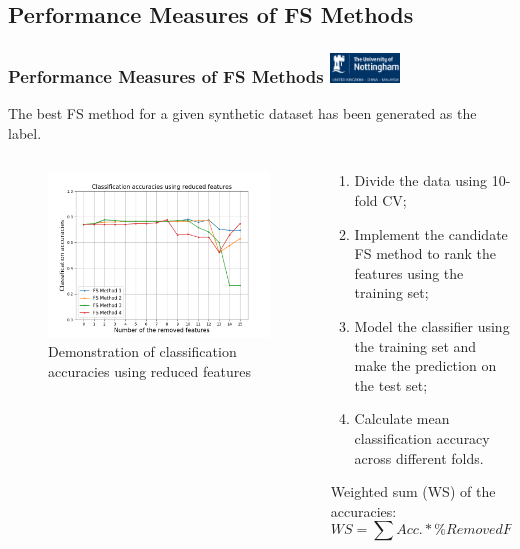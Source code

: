 \documentclass[aspectratio=1610]{beamer}
\newcommand{\UoN}
  {\hfill {\includegraphics[height=0.8cm]{nott_logo/nott_logo_white.png}}}
\begin{document}
\subsection{Performance Measures of FS Methods}
\begin{frame}
\frametitle{Performance Measures of FS Methods \UoN}
The best FS method for a given synthetic dataset has been generated as the label.

	\begin{columns}
		\begin{column}{0.5\textwidth}
			\begin{figure}
				\includegraphics[scale=0.3]{Figures/Accuracy.png}
				\caption{\scriptsize{Demonstration of classification accuracies using reduced features}}
			\end{figure}
		\end{column}

		\begin{column}{0.5\textwidth}
			\begin{enumerate}
				\item Divide the data using 10-fold CV;
				\item Implement the candidate FS method to rank the features using the training set;
				\item Model the classifier using the training set and make the prediction on the test set;
				\item Calculate mean classification accuracy across different folds.
			\end{enumerate}
		
		Weighted sum (WS) of the accuracies:
			\begin{equation}\nonumber
			WS = \sum Acc. * \% RemovedFeatures
			\end{equation}
		\end{column}
	\end{columns}
\end{frame}
\end{document}
